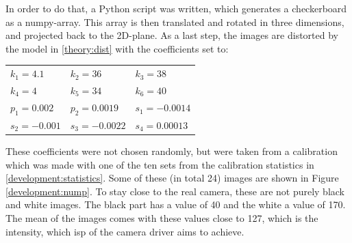 In order to do that, a Python script was written, which generates a checkerboard as a numpy-array.
This array is then translated and rotated in three dimensions, and projected back to the 2D-plane.
As a last step, the images are distorted by the model in \ref{theory:dist} with the coefficients set to:
\begin{center}
	\begin{tabular}{lll}
		$k_1 = 4.1$   &$k_2 = 36$     &$k_3 = 38$\\
		$k_4 = 4$     &$k_5 = 34$     &$k_6 = 40$\\
		$p_1 = 0.002$ &$p_2 = 0.0019$ &$s_1 = -0.0014$\\
		$s_2 = -0.001$&$s_3 = -0.0022$&$s_4 = 0.00013$	
	\end{tabular} 
\end{center}
These coefficients were not chosen randomly, but were taken from a calibration which was made with one of the ten sets from the calibration statistics in \ref{development:statistics}.
Some of these (in total 24) images are shown in Figure \ref{development:nump}.
To stay close to the real camera, these are not purely black and white images.
The black part has a value of 40 and the white a value of 170.
The mean of the images comes with these values close to 127, which is the intensity, which \acs{isp} of the camera driver aims to achieve.
